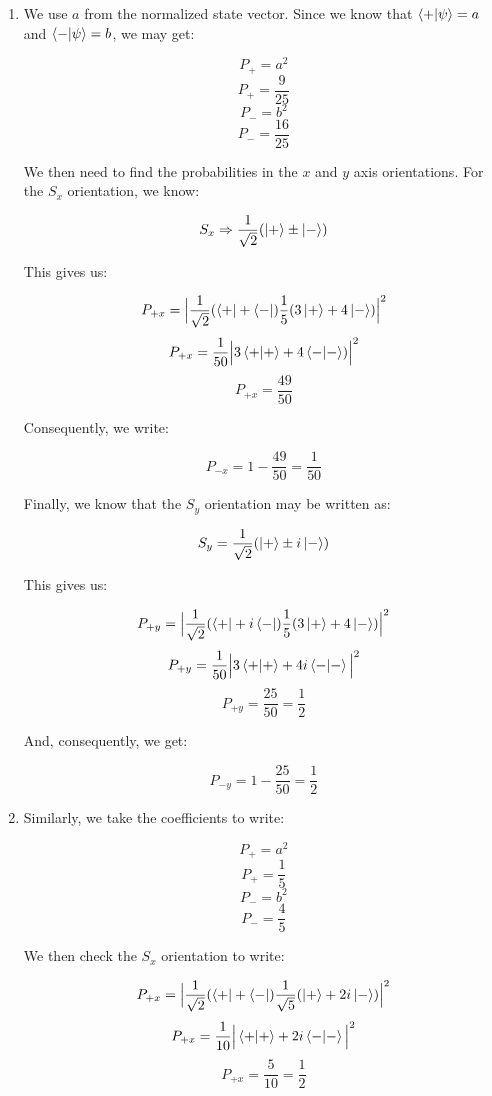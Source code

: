 \begin{enumerate}
\begin{enumerate}
\begin{enumerate}
          \item We use $a$ from the normalized state vector. Since we know that $\bra{+}\ket{\psi}=a$ and $\bra{-}\ket{\psi}=b$, we may get:

            $$P_+=a^2$$
            $$\boxed{P_+=\frac{9}{25}}$$
            $$P_-=b^2$$
            $$\boxed{P_-=\frac{16}{25}}$$

            We then need to find the probabilities in the $x$ and $y$ axis orientations. For the $S_x$ orientation, we know:

            $$S_x\Rightarrow \frac{1}{\sqrt{2}}(\ket{+}\pm \ket{-})$$

            This gives us:

            $$P_{+x}=\Big|\frac{1}{\sqrt{2}}(\bra{+}+\bra{-})\frac{1}{5}(3\ket{+}+4\ket{-})\Big|^2$$
            $$P_{+x}=\frac{1}{50}\Big|3\braket{+}+4\braket{-})\Big|^2$$
            $$\boxed{P_{+x}=\frac{49}{50}}$$

            Consequently, we write:

            $$\boxed{P_{-x}=1-\frac{49}{50}=\frac{1}{50}}$$

            Finally, we know that the $S_y$ orientation may be written as:

            $$S_y=\frac{1}{\sqrt{2}}(\ket{+}\pm i\ket{-})$$

            This gives us:

            $$P_{+y}=\Big|\frac{1}{\sqrt{2}}(\bra{+}+i\bra{-})\frac{1}{5}(3\ket{+}+4\ket{-})\Big|^2$$
            $$P_{+y}=\frac{1}{50}\Big|3\braket{+}+4i\braket{-}\Big|^2$$
            $$\boxed{P_{+y}=\frac{25}{50}=\frac{1}{2}}$$

            And, consequently, we get:

            $$\boxed{P_{-y}=1-\frac{25}{50}=\frac{1}{2}}$$

          \item Similarly, we take the coefficients to write:

            $$P_+=a^2$$
            $$\boxed{P_+=\frac{1}{5}}$$
            $$P_-=b^2$$
            $$\boxed{P_-=\frac{4}{5}}$$

            We then check the $S_x$ orientation to write:

            $$P_{+x}=\Big|\frac{1}{\sqrt{2}}(\bra{+}+\bra{-})\frac{1}{\sqrt{5}}(\ket{+}+2i\ket{-})\Big|^2$$
            $$P_{+x}=\frac{1}{10}\Big|\braket{+}+2i\braket{-}\Big|^2$$
            $$\boxed{P_{+x}=\frac{5}{10}=\frac{1}{2}}$$


\end{enumerate}
\end{enumerate}
\end{enumerate}

